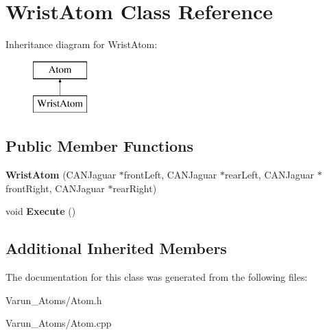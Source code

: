 \hypertarget{class_wrist_atom}{\section{Wrist\-Atom Class Reference}
\label{class_wrist_atom}
}
Inheritance diagram for Wrist\-Atom\-:\begin{figure}[H]
\begin{center}
\leavevmode
\includegraphics[height=2.000000cm]{class_wrist_atom}
\end{center}
\end{figure}
\subsection*{Public Member Functions}
\begin{DoxyCompactItemize}
\item 
\hypertarget{class_wrist_atom_a599f2334fe2ad70e3694b5838a304e1b}{{\bfseries Wrist\-Atom} (C\-A\-N\-Jaguar $\ast$front\-Left, C\-A\-N\-Jaguar $\ast$rear\-Left, C\-A\-N\-Jaguar $\ast$front\-Right, C\-A\-N\-Jaguar $\ast$rear\-Right)}\label{class_wrist_atom_a599f2334fe2ad70e3694b5838a304e1b}

\item 
\hypertarget{class_wrist_atom_a6d48f7678a4140dc893ad71c2462007b}{void {\bfseries Execute} ()}\label{class_wrist_atom_a6d48f7678a4140dc893ad71c2462007b}

\end{DoxyCompactItemize}
\subsection*{Additional Inherited Members}


The documentation for this class was generated from the following files\-:\begin{DoxyCompactItemize}
\item 
Varun\-\_\-\-Atoms/Atom.\-h\item 
Varun\-\_\-\-Atoms/Atom.\-cpp\end{DoxyCompactItemize}
